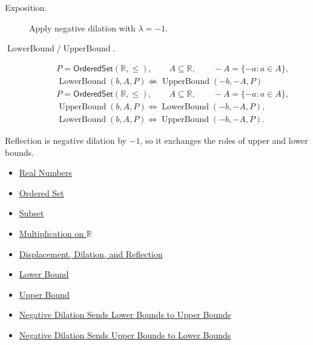 \begin{remark*}
\begin{description}
\item[Exposition.]
Apply negative dilation with $\lambda=-1$.


  \item[\(\operatorname{LowerBound} / \operatorname{UpperBound}.\)]

\[
\begin{aligned}
&P=\mathsf{OrderedSet}(\mathbb{R},\leq),\qquad
A\subseteq\mathbb{R},\qquad -A=\{-a:a\in A\},\\
&\operatorname{LowerBound}(b,A,P)\not\Longleftrightarrow\operatorname{UpperBound}(-b,-A,P)
\end{aligned}
\]
\[
\begin{aligned}
&P=\mathsf{OrderedSet}(\mathbb{R},\leq),\qquad
A\subseteq\mathbb{R},\qquad -A=\{-a:a\in A\},\\
&\operatorname{UpperBound}(b,A,P)\Longleftrightarrow\operatorname{LowerBound}(-b,-A,P),\\
&\operatorname{LowerBound}(b,A,P)\Longleftrightarrow\operatorname{UpperBound}(-b,-A,P).
\end{aligned}
\]
\end{description}
\end{remark*}

\begin{remark*}[Interpretation]
Reflection is negative dilation by $-1$, so it exchanges the roles of upper
and lower bounds.
\end{remark*}

\begin{dependencies}
\begin{itemize}
  \item \hyperref[def:reals]{Real Numbers}
  \item \hyperref[def:ordered-set]{Ordered Set}
  \item \hyperref[def:subset]{Subset}
  \item \hyperref[def:multiplication-on-r]{Multiplication on $\mathbb{R}$}
  \item \hyperref[def:displacement-dilation-reflection]{Displacement, Dilation, and Reflection}
  \item \hyperref[def:real-lower-bound]{Lower Bound}
  \item \hyperref[def:real-upper-bound]{Upper Bound}
  \item \hyperref[prop:negative-dilation-sends-lower-to-upper-bounds]{Negative Dilation Sends Lower Bounds to Upper Bounds}
  \item \hyperref[prop:negative-dilation-sends-upper-to-lower-bounds]{Negative Dilation Sends Upper Bounds to Lower Bounds}
\end{itemize}
\end{dependencies}
